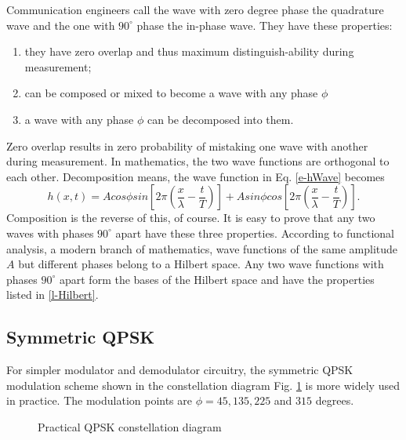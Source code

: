 \documentclass[oneside, letter, 12pt]{book}
\begin{document}
Communication engineers call the wave with zero degree phase the quadrature wave and the one with $90^\circ$ phase the in-phase wave. They have these properties:
\begin{enumerate}\label{l-Hilbert}
    \item they have zero overlap and thus maximum distinguish-ability during measurement;
\item can be composed or mixed to become a wave with any phase $\phi$
\item a wave with any phase $\phi$ can be decomposed into them.
\end{enumerate}

Zero overlap results in zero probability of mistaking one wave with another during measurement. In mathematics, the two wave functions are orthogonal to each other. Decomposition means, the wave function in Eq. \ref{e-hWave} becomes
\begin{equation}\label{e-hWave}
    h(x,t) = A cos\phi sin[2\pi (\frac x \lambda - \frac t T)] + A sin\phi cos[2\pi (\frac x \lambda - \frac t T)].
\end{equation}
Composition is the reverse of this, of course. It is easy to prove that any two waves with phases $90^\circ$ apart have these three properties. According to functional analysis, a modern branch of mathematics, wave functions of the same amplitude $A$ but different phases belong to a Hilbert space. Any two wave functions with phases $90^\circ$ apart form the bases of the Hilbert space and have the properties listed in \ref{l-Hilbert}.

\subsection{Symmetric QPSK}
For simpler modulator and demodulator circuitry, the symmetric QPSK modulation scheme shown in the constellation diagram Fig. \ref{sQPSK} is more widely used in practice. The modulation points are $\phi = 45, 135, 225$ and $315$ degrees.
\begin{figure}[hb]\label{sQPSK}
\caption{Practical QPSK constellation diagram}
\end{figure}
\end{document}
